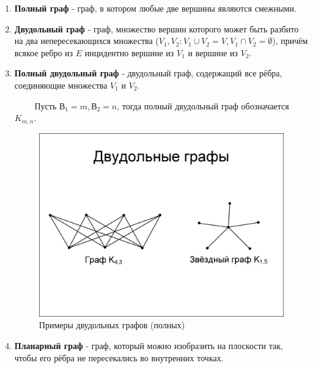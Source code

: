 \documentclass[a4paper,12pt]{article}
\begin{document}
\begin{enumerate}
\begin{figure}[ht]
                    \caption{}
                    
                    \label{fig:ct}
                
            \end{figure}
            
            \item \textbf{Полный граф} - граф, в котором любые две вершины являются смежными.
            \item \textbf{Двудольный граф} - граф, множество вершин которого может быть разбито на два непересекающихся множества ($V_1, V_2: V_1 \cup V_2 = V, V_1 \cap V_2 = \emptyset$), причём всякое ребро из $E$ инцидентно вершине из $V_1$ и вершине из $V_2$.
            \item \textbf{Полный двудольный граф} - двудольный граф, содержащий все рёбра, соединяющие множества $V_1$ и $V_2$.
            
            $\qquad$ Пусть $В_1 = m, В_2 = n$, тогда полный двудольный граф обозначается $K_{m, n}$.
            \begin{figure}[ht]

                    \centering
                    
                    \includegraphics[scale=0.5]{seal.jpg}
                    
                    \caption{Примеры двудольных графов (полных)}
                    
                    \label{fig:mpr}
                
            \end{figure}
            \item \textbf{Планарный граф} - граф, который можно изобразить на плоскости так, чтобы его рёбра не пересекались во внутренних точках.
            

\end{enumerate}
\end{document}
